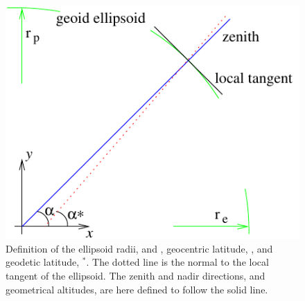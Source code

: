 \begin{figure}
 \begin{center}
  \begin{minipage}[c]{0.65\textwidth}
   \begin{center}
    \includegraphics*[width=0.9\hsize]{latitudes}
   \end{center}
  \end{minipage}%
  \begin{minipage}[c]{0.35\textwidth}
   \caption{Definition of the ellipsoid radii,  and , 
     geocentric latitude, \Lat, and geodetic latitude, \Lat$^*$. The
     dotted line is the normal to the local tangent of the
     ellipsoid. The zenith and nadir directions, and geometrical
     altitudes, are here defined to follow the solid line.}
   \label{fig:ppath:lats}
  \end{minipage}
 \end{center}
\end{figure}   

